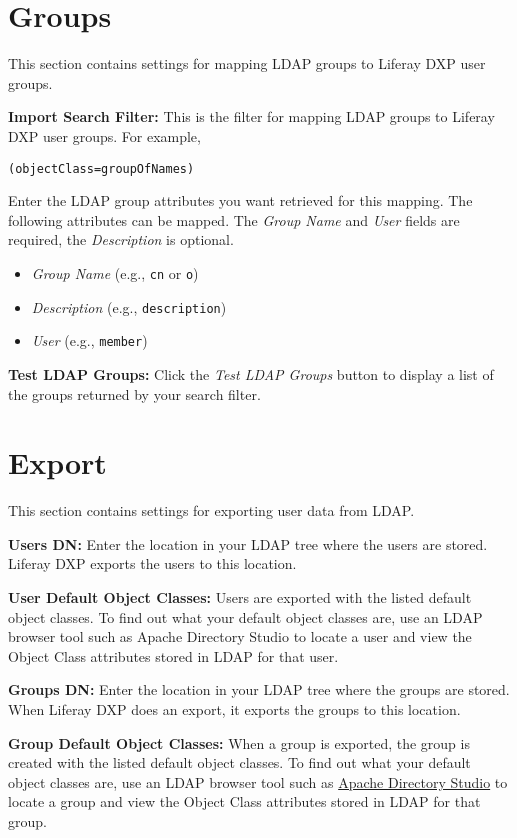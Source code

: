 \section{Groups}\label{groups}

This section contains settings for mapping LDAP groups to Liferay DXP
user groups.

\textbf{Import Search Filter:} This is the filter for mapping LDAP
groups to Liferay DXP user groups. For example,

\begin{verbatim}
(objectClass=groupOfNames)
\end{verbatim}

Enter the LDAP group attributes you want retrieved for this mapping. The
following attributes can be mapped. The \emph{Group Name} and
\emph{User} fields are required, the \emph{Description} is optional.

\begin{itemize}
\item
  \emph{Group Name} (e.g., \texttt{cn} or \texttt{o})
\item
  \emph{Description} (e.g., \texttt{description})
\item
  \emph{User} (e.g., \texttt{member})
\end{itemize}

\textbf{Test LDAP Groups:} Click the \emph{Test LDAP Groups} button to
display a list of the groups returned by your search filter.

\section{Export}\label{export}

This section contains settings for exporting user data from LDAP.

\textbf{Users DN:} Enter the location in your LDAP tree where the users
are stored. Liferay DXP exports the users to this location.

\textbf{User Default Object Classes:} Users are exported with the listed
default object classes. To find out what your default object classes
are, use an LDAP browser tool such as Apache Directory Studio to locate
a user and view the Object Class attributes stored in LDAP for that
user.

\textbf{Groups DN:} Enter the location in your LDAP tree where the
groups are stored. When Liferay DXP does an export, it exports the
groups to this location.

\textbf{Group Default Object Classes:} When a group is exported, the
group is created with the listed default object classes. To find out
what your default object classes are, use an LDAP browser tool such as
\href{https://directory.apache.org/studio}{Apache Directory Studio} to
locate a group and view the Object Class attributes stored in LDAP for
that group.

